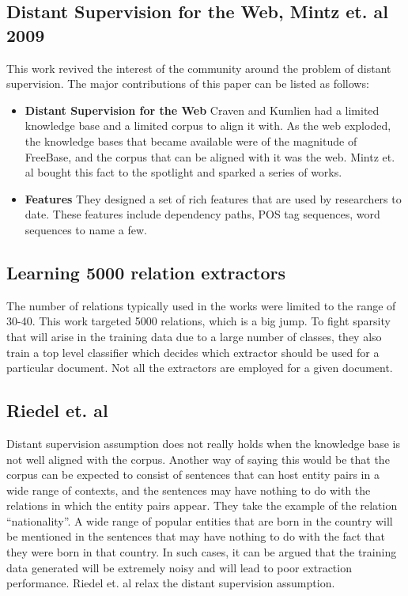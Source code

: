 \documentclass[a4paper,10pt]{article}
\begin{document}
\subsection{Distant Supervision for the Web, Mintz et. al 2009}
This work revived the interest of the community around the problem of distant supervision.
The major contributions of this paper can be listed as follows:
\begin{itemize}
 \item \textbf{Distant Supervision for the Web}
 Craven and Kumlien had a limited knowledge base and a limited corpus to align it with.
 As the web exploded, the knowledge bases that became available were of the magnitude of FreeBase, and the
 corpus that can be aligned with it was the web. Mintz et. al bought this fact to the spotlight and sparked 
 a series of works.
 
 \item \textbf{Features}
 They designed a set of rich features that are used by researchers to date. These features include dependency paths, POS tag sequences, word sequences to name a few.
 
\end{itemize}

\subsection{Learning 5000 relation extractors}
The number of relations typically used in the works were limited to the range of 30-40. 
This work targeted 5000 relations, which is a big jump. To fight sparsity that will arise 
in the training data due to a large number of classes, they also train a top level classifier
which decides which extractor should be used for a particular document. Not all the extractors 
are employed for a given document.

\subsection{Riedel et. al}
Distant supervision assumption does not really holds when the knowledge base is not well aligned with the corpus.
Another way of saying this would be that the corpus can be expected to consist of sentences that can host entity pairs
in a wide range of contexts, and the sentences may have nothing to do with the relations in which the entity pairs appear.
They take the example of the relation ``nationality''. A wide range of popular entities that are born in the country 
will be mentioned in the sentences that may have nothing to do with the fact that they were born in that country.
In such cases, it can be argued that the training data generated will be extremely noisy and will lead to poor extraction 
performance. Riedel et. al relax the distant supervision assumption.
\end{document}
